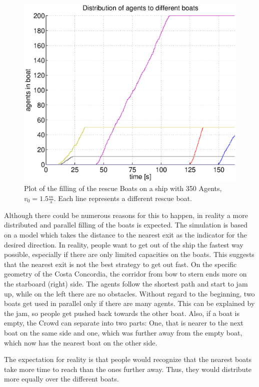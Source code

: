 \documentclass[11pt]{article}
\begin{document}
\begin{figure}[h]
	\centering
	\includegraphics[scale=0.5]{images/distribution33.eps}
	\caption{Plot of the filling of the rescue Boats on a ship with 350 Agents, \(v_0=1.5\frac{m}{s}\).
	Each line represents a different rescue boat.}
	\label{distribution33}
\end{figure}

Although there could be numerous
reasons for this to happen, in reality a more distributed and parallel filling
of the boats is expected.  The simulation is based on a model which takes the
distance to the nearest exit as the indicator for the desired direction.  In
reality, people want to get out of the ship the fastest way possible,
especially if there are only limited capacities on the boats.  This suggests
that the nearest exit is not the best strategy to get out fast.  On the
specific geometry of the Costa Concordia, the corridor from bow to stern ends
more on the starboard (right) side.  The agents follow the shortest path and
start to jam up, while on the left there are no obstacles.
Without regard to the beginning, two boats get used in parallel only if there are many agents.
This can be explained by the jam, so people get pushed back towards the other 
boat. Also, if a boat is empty, the Crowd can separate into two parts: One,
that is nearer to the next boat on the same side and one, which was further
away from the empty boat, which now has the nearest boat on the other side.

The expectation for reality is that people would recognize that the nearest 
boats take more time to reach than the ones further away. Thus, they would 
distribute more equally over the different boats.
\end{document}
